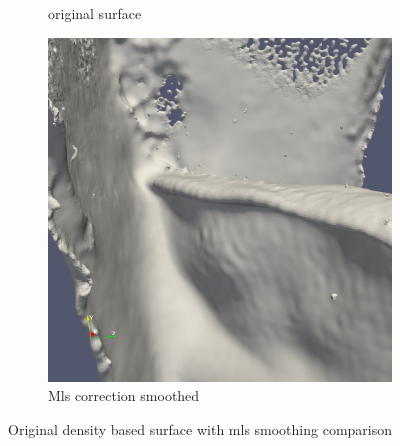 \begin{figure}
\begin{center}
\begin{subfigure}[b]{0.47\textwidth}
			\caption{original surface}
		\end{subfigure}
		\begin{subfigure}[b]{0.47\textwidth}
			\includegraphics[width=\textwidth]{figures/DDMMls2.png}
			\caption{Mls correction smoothed}
		\end{subfigure}
	\end{center}
	\caption{Original density based surface with mls smoothing comparison} \label{fig:db_mls_reconstruction1}
\end{figure}
